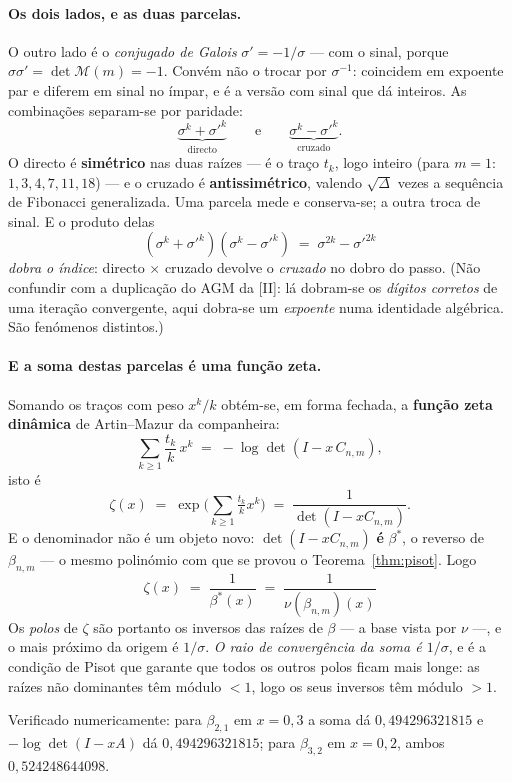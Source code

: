 \documentclass[11pt,a4paper]{article}
\theoremstyle{plain}
\theoremstyle{definition}
\theoremstyle{remark}
\newcommand{\Mat}[1]{\mathcal{M}(#1)}
\providecommand{\Comp}[2]{C_{#1,#2}}
\begin{document}
\paragraph{Os dois lados, e as duas parcelas.} O outro lado é o \emph{conjugado de Galois}
$\sigma' = -1/\sigma$ --- com o sinal, porque $\sigma\sigma' = \det\Mat{m} = -1$. Convém não o
trocar por $\sigma^{-1}$: coincidem em expoente par e diferem em sinal no ímpar, e é a versão com
sinal que dá inteiros. As combinações separam-se por paridade:
\[
  \underbrace{\sigma^k + \sigma'^k}_{\text{directo}} \qquad\text{e}\qquad
  \underbrace{\sigma^k - \sigma'^k}_{\text{cruzado}} .
\]
O directo é \textbf{simétrico} nas duas raízes --- é o traço $t_k$, logo inteiro (para $m=1$:
$1,3,4,7,11,18$) --- e o cruzado é \textbf{antissimétrico}, valendo $\sqrt{\Delta}$ vezes a
sequência de Fibonacci generalizada. Uma parcela mede e conserva-se; a outra troca de sinal. E o
produto delas
\[
  (\sigma^k+\sigma'^k)(\sigma^k-\sigma'^k) \;=\; \sigma^{2k}-\sigma'^{2k}
\]
\emph{dobra o índice}: directo $\times$ cruzado devolve o \emph{cruzado} no dobro do passo. (Não
confundir com a duplicação do AGM da [II]: lá dobram-se os \emph{dígitos
corretos} de uma iteração convergente, aqui dobra-se um \emph{expoente} numa identidade algébrica.
São fenómenos distintos.)

\paragraph{E a soma destas parcelas é uma função zeta.} Somando os traços com peso $x^k/k$
obtém-se, em forma fechada, a \textbf{função zeta dinâmica} de Artin--Mazur da companheira:
\[
  \sum_{k\geq1} \frac{t_k}{k}\,x^k \;=\; -\log\det(I - x\,\Comp{n}{m}),
\]
isto é
\[
  \zeta(x) \;=\; \exp\Big(\sum_{k\geq1}\tfrac{t_k}{k}x^k\Big) \;=\; \frac{1}{\det(I - x\Comp{n}{m})} .
\]
E o denominador não é um objeto novo: $\det(I-x\Comp{n}{m})$ \textbf{é} $\beta^*$, o reverso de
$\beta_{n,m}$ --- o mesmo polinómio com que se provou o Teorema~\ref{thm:pisot}. Logo
\[
  \boxed{\;\zeta(x) \;=\; \frac{1}{\beta^*(x)} \;=\; \frac{1}{\nu(\beta_{n,m})(x)}\;}
\]
Os \emph{polos} de $\zeta$ são portanto os inversos das raízes de $\beta$ --- a base vista por
$\nu$ ---, e o mais próximo da origem é $1/\sigma$. \emph{O raio de convergência da soma é
$1/\sigma$}, e é a condição de Pisot que garante que todos os outros polos ficam mais longe: as
raízes não dominantes têm módulo $<1$, logo os seus inversos têm módulo $>1$.

Verificado numericamente: para $\beta_{2,1}$ em $x=0{,}3$ a soma dá $0{,}494296321815$ e
$-\log\det(I-x A)$ dá $0{,}494296321815$; para $\beta_{3,2}$ em $x=0{,}2$, ambos
$0{,}524248644098$.
\end{document}
